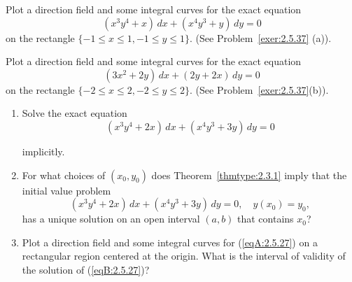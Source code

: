 \documentclass{ximera}
\begin{document}
\begin{problem}\label{exer:2.5.25}
Plot a direction field and some integral curves for the exact equation
$$
(x^3y^4+x)\,dx+(x^4y^3+y)\,dy=0
$$
on the rectangle $\{-1\leq x\leq 1,-1\leq y\leq 1\}$. (See
Problem~\ref{exer:2.5.37} (a)).
\end{problem}

\begin{problem}\label{exer:2.5.26}
Plot a direction field and some integral curves for the exact equation
$$
(3x^2+2y)\,dx+(2y+2x)\,dy=0
$$
on the rectangle $\{-2\leq x\leq 2,-2\leq y\leq 2\}$. (See
Problem~\ref{exer:2.5.37}(b)).
\end{problem}

\begin{problem}\label{exer:2.5.27}
\begin{enumerate}
\item %
Solve the exact equation
\begin{equation}\label{eqA:2.5.27}
(x^3y^4+2x)\,dx+(x^4y^3+3y)\,dy=0
\end{equation}

implicitly.
\item %
For what choices of $(x_0,y_0)$ does
Theorem~\ref{thmtype:2.3.1} imply that the initial value problem
\begin{equation}\label{eqB:2.5.27}
(x^3y^4+2x)\,dx+(x^4y^3+3y)\,dy=0,\quad y(x_0)=y_0,
\end{equation}
has a unique solution on an open interval $(a,b)$  that contains $x_0$?
\item %
Plot a direction field and some integral curves for (\ref{eqA:2.5.27})
on a rectangular region centered at the origin. What is the
 interval of validity of the solution of (\ref{eqB:2.5.27})?
\end{enumerate}
\end{problem}
\end{document}
